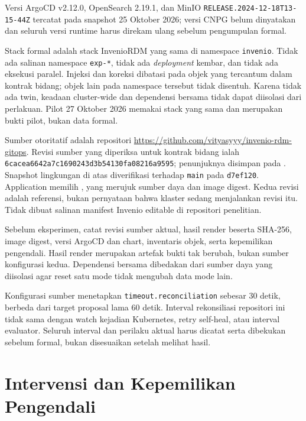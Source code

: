 Versi ArgoCD v2.12.0, OpenSearch 2.19.1, dan MinIO \texttt{RELEASE.2024-12-18T13-15-44Z} tercatat pada snapshot 25 Oktober 2026; versi CNPG belum dinyatakan dan seluruh versi runtime harus direkam ulang sebelum pengumpulan formal.

Stack formal adalah stack InvenioRDM yang sama di namespace \texttt{invenio}. Tidak ada salinan namespace \texttt{exp-*}, tidak ada \textit{deployment} kembar, dan tidak ada eksekusi paralel. Injeksi dan koreksi dibatasi pada objek yang tercantum dalam kontrak bidang; objek lain pada namespace tersebut tidak disentuh. Karena tidak ada twin, keadaan cluster-wide dan dependensi bersama tidak dapat diisolasi dari perlakuan. Pilot 27 Oktober 2026 memakai stack yang sama dan merupakan bukti pilot, bukan data formal.

Sumber otoritatif adalah repositori \url{https://github.com/vityasyyy/invenio-rdm-gitops}. Revisi sumber yang diperiksa untuk kontrak bidang ialah \nolinkurl{6cacea6642a7c1690243d3b54130fa08216a9595}; penunjuknya disimpan pada . Snapshot lingkungan di atas diverifikasi terhadap \texttt{main} pada \texttt{d7ef120}. Application  memilih , yang merujuk sumber daya dan image digest. Kedua revisi adalah referensi, bukan pernyataan bahwa klaster sedang menjalankan revisi itu. Tidak dibuat salinan manifest Invenio editable di repositori penelitian.

Sebelum eksperimen, catat revisi sumber aktual, hasil render beserta SHA-256, image digest, versi ArgoCD dan chart, inventaris objek, serta kepemilikan pengendali. Hasil render merupakan artefak bukti tak berubah, bukan sumber konfigurasi kedua. Dependensi bersama dibedakan dari sumber daya yang diisolasi agar reset satu mode tidak mengubah data mode lain.

Konfigurasi sumber  menetapkan \texttt{timeout.reconciliation} sebesar 30 detik, berbeda dari target proposal lama 60 detik. Interval rekonsiliasi repositori ini tidak sama dengan watch kejadian Kubernetes, retry self-heal, atau interval evaluator. Seluruh interval dan perilaku aktual harus dicatat serta dibekukan sebelum formal, bukan disesuaikan setelah melihat hasil.

\section{Intervensi dan Kepemilikan Pengendali}

